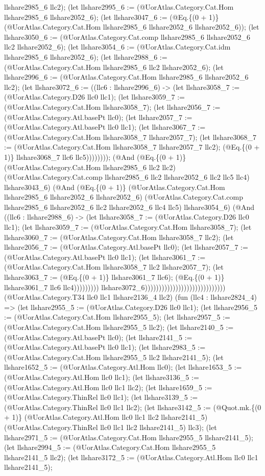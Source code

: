 \documentclass[11pt]{article}
\begin{document}
llshare2985\_6 llc2); (let llshare2995\_6 := (@UorAtlas.Category.Cat.Hom llshare2985\_6 llshare2052\_6); (let llshare3047\_6 := (@Eq.\{(0 + 1)\} (@UorAtlas.Category.Cat.Hom llshare2985\_6 llshare2052\_6 llshare2052\_6)); (let llshare3050\_6 := (@UorAtlas.Category.Cat.comp llshare2985\_6 llshare2052\_6 llc2 llshare2052\_6); (let llshare3054\_6 := (@UorAtlas.Category.Cat.idm llshare2985\_6 llshare2052\_6); (let llshare2988\_6 := (@UorAtlas.Category.Cat.Hom llshare2985\_6 llc2 llshare2052\_6); (let llshare2996\_6 := (@UorAtlas.Category.Cat.Hom llshare2985\_6 llshare2052\_6 llc2); (let llshare3072\_6 := ((llc6 : llshare2996\_6) -> (let llshare3058\_7 := (@UorAtlas.Category.D26 llc0 llc1); (let llshare3059\_7 := (@UorAtlas.Category.Cat.Hom llshare3058\_7); (let llshare2056\_7 := (@UorAtlas.Category.Atl.basePt llc0); (let llshare2057\_7 := (@UorAtlas.Category.Atl.basePt llc0 llc1); (let llshare3067\_7 := (@UorAtlas.Category.Cat.Hom llshare3058\_7 llshare2057\_7); (let llshare3068\_7 := (@UorAtlas.Category.Cat.Hom llshare3058\_7 llshare2057\_7 llc2); (@Eq.\{(0 + 1)\} llshare3068\_7 llc6 llc5)))))))); (@And (@Eq.\{(0 + 1)\} (@UorAtlas.Category.Cat.Hom llshare2985\_6 llc2 llc2) (@UorAtlas.Category.Cat.comp llshare2985\_6 llc2 llshare2052\_6 llc2 llc5 llc4) llshare3043\_6) (@And (@Eq.\{(0 + 1)\} (@UorAtlas.Category.Cat.Hom llshare2985\_6 llshare2052\_6 llshare2052\_6) (@UorAtlas.Category.Cat.comp llshare2985\_6 llshare2052\_6 llc2 llshare2052\_6 llc4 llc5) llshare3054\_6) (@And ((llc6 : llshare2988\_6) -> (let llshare3058\_7 := (@UorAtlas.Category.D26 llc0 llc1); (let llshare3059\_7 := (@UorAtlas.Category.Cat.Hom llshare3058\_7); (let llshare3060\_7 := (@UorAtlas.Category.Cat.Hom llshare3058\_7 llc2); (let llshare2056\_7 := (@UorAtlas.Category.Atl.basePt llc0); (let llshare2057\_7 := (@UorAtlas.Category.Atl.basePt llc0 llc1); (let llshare3061\_7 := (@UorAtlas.Category.Cat.Hom llshare3058\_7 llc2 llshare2057\_7); (let llshare3063\_7 := (@Eq.\{(0 + 1)\} llshare3061\_7 llc6); (@Eq.\{(0 + 1)\} llshare3061\_7 llc6 llc4))))))))) llshare3072\_6))))))))))))))))))))))))))))) (@UorAtlas.Category.T34 llc0 llc1 llshare2136\_4 llc2) (fun (llc4 : llshare2824\_4) => (let llshare2955\_5 := (@UorAtlas.Category.D26 llc0 llc1); (let llshare2956\_5 := (@UorAtlas.Category.Cat.Hom llshare2955\_5); (let llshare2957\_5 := (@UorAtlas.Category.Cat.Hom llshare2955\_5 llc2); (let llshare2140\_5 := (@UorAtlas.Category.Atl.basePt llc0); (let llshare2141\_5 := (@UorAtlas.Category.Atl.basePt llc0 llc1); (let llshare2983\_5 := (@UorAtlas.Category.Cat.Hom llshare2955\_5 llc2 llshare2141\_5); (let llshare1652\_5 := (@UorAtlas.Category.Atl.Hom llc0); (let llshare1653\_5 := (@UorAtlas.Category.Atl.Hom llc0 llc1); (let llshare3136\_5 := (@UorAtlas.Category.Atl.Hom llc0 llc1 llc2); (let llshare1659\_5 := (@UorAtlas.Category.ThinRel llc0 llc1); (let llshare3139\_5 := (@UorAtlas.Category.ThinRel llc0 llc1 llc2); (let llshare3142\_5 := (@Quot.mk.\{(0 + 1)\} (@UorAtlas.Category.Atl.Hom llc0 llc1 llc2 llshare2141\_5) (@UorAtlas.Category.ThinRel llc0 llc1 llc2 llshare2141\_5) llc3); (let llshare2971\_5 := (@UorAtlas.Category.Cat.Hom llshare2955\_5 llshare2141\_5); (let llshare2994\_5 := (@UorAtlas.Category.Cat.Hom llshare2955\_5 llshare2141\_5 llc2); (let llshare3172\_5 := (@UorAtlas.Category.Atl.Hom llc0 llc1 llshare2141\_5); 
\end{document}
